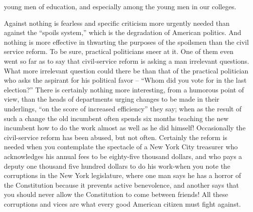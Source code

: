\documentclass[a4paper]{amsbook}
\begin{document}
young men of education, and especially among the young men in our colleges.

Against nothing is fearless and specific criticism more urgently needed than against the “spoils system,” which is the degradation of American politics. And nothing is more effective in thwarting the purposes of the spoilsmen than the civil service reform. To be sure, practical politicians sneer at it. One of them even went so far as to say that civil-service reform is asking a man irrelevant questions. What more irrelevant question could there be than that of the practical politician who asks the aspirant for his political favor – “Whom did you vote for in the last election?” There is certainly nothing more interesting, from a humorous point of view, than the heads of departments urging changes to be made in their underlings, “on the score of increased efficiency” they say; when as the result of such a change the old incumbent often spends six months teaching the new incumbent how to do the work almost as well as he did himself! Occasionally the civil-service reform has been abused, but not often. Certainly the reform is needed when you contemplate the spectacle of a New York City treasurer who acknowledges his annual fees to be eighty-five thousand dollars, and who pays a deputy one thousand five hundred dollars to do his work-when you note the corruptions in the New York legislature, where one man says he has a horror of the Constitution because it prevents active benevolence, and another says that you should never allow the Constitution to come between friends! All these corruptions and vices are what every good American citizen must fight against.
\end{document}

